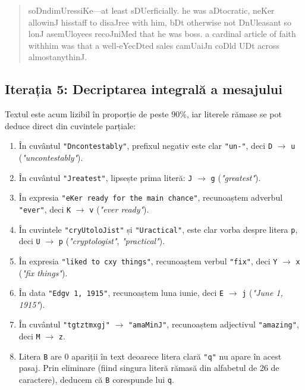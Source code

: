 \documentclass{labreport}
\begin{document}
\begin{quote}
soDndimUressiKe---at least sDUerficially. he was aDtocratic, neKer allowinJ hisstaff to disaJree with him, bDt otherwise not DnUleasant so lonJ asemUloyees recoJniMed that he was boss. a cardinal article of faith withhim was that a well-eYecDted sales camUaiJn coDld UDt across almostanythinJ.
\end{quote}

\subsection{Iterația 5: Decriptarea integrală a mesajului}

Textul este acum lizibil în proporție de peste $90\%$, iar literele rămase se pot deduce direct din cuvintele parțiale:
\begin{enumerate}[leftmargin=*]
    \item În cuvântul \texttt{"Dncontestably"}, prefixul negativ este clar \texttt{"un-"}, deci \texttt{D} $\to$ \texttt{u} (\textit{"uncontestably"}).
    \item În cuvântul \texttt{"Jreatest"}, lipsește prima literă: \texttt{J} $\to$ \texttt{g} (\textit{"greatest"}).
    \item În expresia \texttt{"eKer ready for the main chance"}, recunoaștem adverbul \texttt{"ever"}, deci \texttt{K} $\to$ \texttt{v} (\textit{"ever ready"}).
    \item În cuvintele \texttt{"cryUtoloJist"} și \texttt{"Uractical"}, este clar vorba despre litera \texttt{p}, deci \texttt{U} $\to$ \texttt{p} (\textit{"cryptologist"}, \textit{"practical"}).
    \item În expresia \texttt{"liked to cxy things"}, recunoaștem verbul \texttt{"fix"}, deci \texttt{Y} $\to$ \texttt{x} (\textit{"fix things"}).
    \item În data \texttt{"Edgv 1, 1915"}, recunoaștem luna iunie, deci \texttt{E} $\to$ \texttt{j} (\textit{"June 1, 1915"}).
    \item În cuvântul \texttt{"tgtztmxgj"} $\to$ \texttt{"amaMinJ"}, recunoaștem adjectivul \texttt{"amazing"}, deci \texttt{M} $\to$ \texttt{z}.
    \item Litera \texttt{B} are 0 apariții în text deoarece litera clară \texttt{"q"} nu apare în acest pasaj. Prin eliminare (fiind singura literă rămasă din alfabetul de 26 de caractere), deducem că \texttt{B} corespunde lui \texttt{q}.
\end{enumerate}
\end{document}
